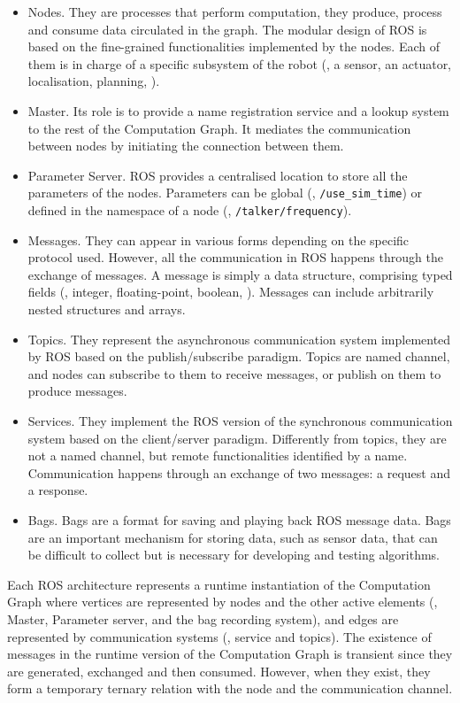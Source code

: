 \begin{itemize}
\item Nodes. They are processes that perform computation, they produce, process and consume data circulated in the graph. The modular design of ROS is based on the fine-grained functionalities implemented by the nodes. Each of them is in charge of a specific subsystem of the robot (\eg, a sensor, an actuator, localisation, planning, \etc). 
\item Master. Its role is to provide a name registration service and a lookup system to the rest of the Computation Graph. It mediates the communication between nodes by initiating the connection between them. 
\item Parameter Server. ROS provides a centralised location to store all the parameters of the nodes. Parameters can be global (\eg, \texttt{/use\_sim\_time}) or defined in the namespace of a node (\eg, \texttt{/talker/frequency}).
\item Messages. They can appear in various forms depending on the specific protocol used. However, all the communication in ROS happens through the exchange of messages. A message is simply a data structure, comprising typed fields (\eg, integer, floating-point, boolean, \etc). Messages can include arbitrarily nested structures and arrays.
\item Topics. They represent the asynchronous communication system implemented by ROS based on the publish/subscribe paradigm. Topics are named channel, and nodes can subscribe to them to receive messages, or publish on them to produce messages.
\item Services. They implement the ROS version of the synchronous communication system based on the client/server paradigm. Differently from topics, they are not a named channel, but remote functionalities identified by a name. Communication happens through an exchange of two messages: a request and a response.
\item Bags. Bags are a format for saving and playing back ROS message data. Bags are an important mechanism for storing data, such as sensor data, that can be difficult to collect but is necessary for developing and testing algorithms. 
\end{itemize}

Each ROS architecture represents a runtime instantiation of the Computation Graph where vertices are represented by nodes and the other active elements (\ie, Master, Parameter server, and the bag recording system), and edges are represented by communication systems (\ie, service and topics). The existence of messages in the runtime version of the Computation Graph is transient since they are generated, exchanged and then consumed. However, when they exist, they form a temporary ternary relation with the node and the communication channel.

